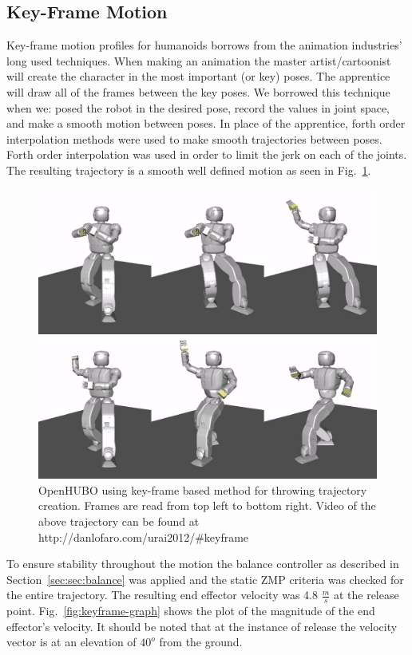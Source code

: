 \subsection{Key-Frame Motion}\label{sec:sec:keyframe}

Key-frame motion profiles for humanoids borrows from the animation industries' long used techniques.  
When making an animation the master artist/cartoonist will create the character in the most important (or key) poses.  
The apprentice will draw all of the frames between the key poses.  
We borrowed this technique when we: posed the robot in the desired pose, record the values in joint space, and make a smooth motion between poses.  
In place of the apprentice, forth order interpolation methods were used to make smooth trajectories between poses.  
Forth order interpolation was used in order to limit the jerk on each of the joints.  
The resulting trajectory is a smooth well defined motion as seen in Fig.~\ref{fig:keyframe-throw}.

\begin{figure}[t]
  \centering
\includegraphics[width=1.0\columnwidth]{./pix/keyframe/keyframe.png}
  \caption{OpenHUBO using key-frame based method for throwing trajectory creation.  Frames are read from top left to bottom right.  Video of the above trajectory can be found at http://danlofaro.com/urai2012/\#keyframe}
  \label{fig:keyframe-throw}
\end{figure}

To ensure stability throughout the motion the balance controller as described in Section~\ref{sec:sec:balance} was applied and the static ZMP criteria was checked for the entire trajectory.
The resulting end effector velocity was 4.8 $\frac{m}{s}$ at the release point.  
Fig.~\ref{fig:keyframe-graph} shows the plot of the magnitude of the end effector's velocity.  
It should be noted that at the instance of release the velocity vector is at an elevation of $40^o$ from the ground.

